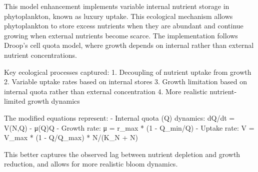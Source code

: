 This model enhancement implements variable internal nutrient storage in phytoplankton, known as luxury uptake. This ecological mechanism allows phytoplankton to store excess nutrients when they are abundant and continue growing when external nutrients become scarce. The implementation follows Droop's cell quota model, where growth depends on internal rather than external nutrient concentrations.

Key ecological processes captured:
1. Decoupling of nutrient uptake from growth
2. Variable uptake rates based on internal stores
3. Growth limitation based on internal quota rather than external concentration
4. More realistic nutrient-limited growth dynamics

The modified equations represent:
- Internal quota (Q) dynamics: dQ/dt = V(N,Q) - μ(Q)Q
- Growth rate: μ = r_max * (1 - Q_min/Q)
- Uptake rate: V = V_max * (1 - Q/Q_max) * N/(K_N + N)

This better captures the observed lag between nutrient depletion and growth reduction, and allows for more realistic bloom dynamics.
